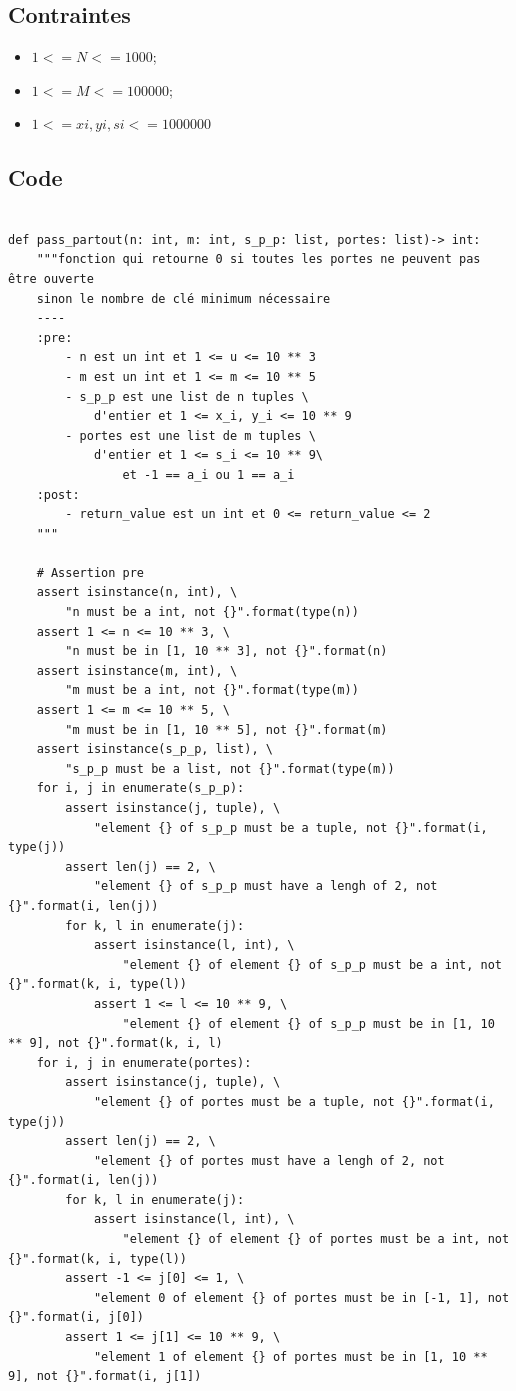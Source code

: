 \documentclass{article}
\begin{document}
        \subsection{Contraintes}
            \begin{itemize}
                \item $1 <= N <= 1 000$;
                \item $1 <= M <= 100 000$;
                \item $1 <= xi, yi, si <= 1 000 000$
            \end{itemize}
        
        \subsection{Code}
            \begin{verbatim}

def pass_partout(n: int, m: int, s_p_p: list, portes: list)-> int:
    """fonction qui retourne 0 si toutes les portes ne peuvent pas être ouverte
    sinon le nombre de clé minimum nécessaire
    ----
    :pre:
        - n est un int et 1 <= u <= 10 ** 3
        - m est un int et 1 <= m <= 10 ** 5
        - s_p_p est une list de n tuples \
            d'entier et 1 <= x_i, y_i <= 10 ** 9
        - portes est une list de m tuples \
            d'entier et 1 <= s_i <= 10 ** 9\
                et -1 == a_i ou 1 == a_i
    :post:
        - return_value est un int et 0 <= return_value <= 2
    """

    # Assertion pre
    assert isinstance(n, int), \
        "n must be a int, not {}".format(type(n))
    assert 1 <= n <= 10 ** 3, \
        "n must be in [1, 10 ** 3], not {}".format(n)
    assert isinstance(m, int), \
        "m must be a int, not {}".format(type(m))
    assert 1 <= m <= 10 ** 5, \
        "m must be in [1, 10 ** 5], not {}".format(m)
    assert isinstance(s_p_p, list), \
        "s_p_p must be a list, not {}".format(type(m))
    for i, j in enumerate(s_p_p):
        assert isinstance(j, tuple), \
            "element {} of s_p_p must be a tuple, not {}".format(i, type(j))
        assert len(j) == 2, \
            "element {} of s_p_p must have a lengh of 2, not {}".format(i, len(j))
        for k, l in enumerate(j):
            assert isinstance(l, int), \
                "element {} of element {} of s_p_p must be a int, not {}".format(k, i, type(l))
            assert 1 <= l <= 10 ** 9, \
                "element {} of element {} of s_p_p must be in [1, 10 ** 9], not {}".format(k, i, l)
    for i, j in enumerate(portes):
        assert isinstance(j, tuple), \
            "element {} of portes must be a tuple, not {}".format(i, type(j))
        assert len(j) == 2, \
            "element {} of portes must have a lengh of 2, not {}".format(i, len(j))
        for k, l in enumerate(j):
            assert isinstance(l, int), \
                "element {} of element {} of portes must be a int, not {}".format(k, i, type(l))
        assert -1 <= j[0] <= 1, \
            "element 0 of element {} of portes must be in [-1, 1], not {}".format(i, j[0])
        assert 1 <= j[1] <= 10 ** 9, \
            "element 1 of element {} of portes must be in [1, 10 ** 9], not {}".format(i, j[1]) 


\end{verbatim}
\end{document}

